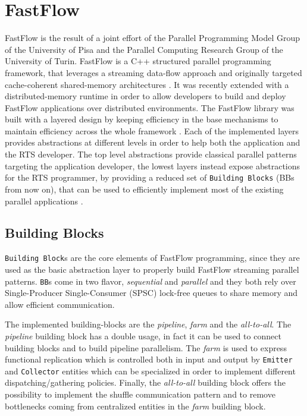 \chapter{FastFlow}
\label{chap:fastflow}
FastFlow is the result of a joint effort of the Parallel Programming Model Group of the University of Pisa and the Parallel Computing Research Group of the University of Turin. FastFlow is a C++ structured parallel programming framework, that leverages a streaming data-flow approach and originally targeted cache-coherent shared-memory architectures \cite{fastflow}. It was recently extended with a distributed-memory runtime in order to allow developers to build and deploy FastFlow applications over distributed environments. The FastFlow library was built with a layered design by keeping efficiency in the base mechanisms to maintain efficiency across the whole framework \cite{fastflow-highlevel}. Each of the implemented layers provides abstractions at different levels in order to help both the application and the RTS developer. The top level abstractions provide classical parallel patterns targeting the application developer, the lowest layers instead expose abstractions for the RTS programmer, by providing a reduced set of \texttt{Building Blocks} (BBs from now on), that can be used to efficiently implement most of the existing parallel applications \cite{fastflow-highlevel}.

\section{Building Blocks}
\texttt{Building Block}s are the core elements of FastFlow programming, since they are used as the basic abstraction layer to properly build FastFlow streaming parallel patterns. \texttt{BB}s come in two flavor, \textit{sequential} and \textit{parallel} and they both rely over Single-Producer Single-Consumer (SPSC) lock-free queues to share memory and allow efficient communication.\newline

The implemented building-blocks are the \textit{pipeline}, \textit{farm} and the \textit{all-to-all}. The \textit{pipeline} building block has a double usage, in fact it can be used to connect building blocks and to build pipeline parallelism. The \textit{farm} is used to express functional replication which is controlled both in input and output by \texttt{Emitter} and \texttt{Collector} entities which can be specialized in order to implement different dispatching/gathering policies. Finally, the \textit{all-to-all} building block offers the possibility to implement the shuffle communication pattern and to remove bottlenecks coming from centralized entities in the \textit{farm} building block.


